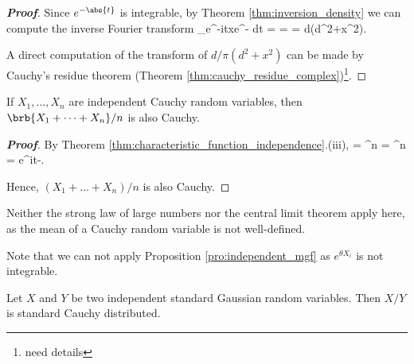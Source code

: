 \begin{proof}[\bf Proof]
Since $e^{-\abs{t}}$ is integrable, by Theorem \ref{thm:inversion_density} we can compute the inverse Fourier transform
\be
{}\int_\R e^{-itx}e^{-} dt =  =  = \frac d{\pi(d^2+x^2)}.
\ee

A direct computation of the transform of $d/\pi(d^2+x^2)$ can be made by Cauchy's residue theorem (Theorem \ref{thm:cauchy_residue_complex})\footnote{need details}.
\end{proof}

\begin{proposition}
If $X_1,\dots,X_n$ are independent Cauchy random variables, then $\brb{X_1+\dots+X_n}/n$ is also Cauchy.
\end{proposition}

\begin{proof}[\bf Proof]
By Theorem \ref{thm:characteristic_function_independence}.(iii),
\be
\E {} = ^n = ^n = e^{i\mu t-}.
\ee

Hence, $(X_1+\dots+X_n)/n$ is also Cauchy.
\end{proof}

\begin{remark}
Neither the strong law of large numbers nor the central limit theorem apply here, as the mean of a Cauchy random variable is not well-defined. %

Note that we can not apply Proposition \ref{pro:independent_mgf} as $e^{\theta X_i}$ is not integrable. %
\end{remark}

\begin{proposition}\label{pro:two_independent_standard_gaussian_quotient_implies_cauchy}
Let $X$ and $Y$ be two independent standard Gaussian random variables. Then $X/Y$ is standard Cauchy distributed.
\end{proposition}

